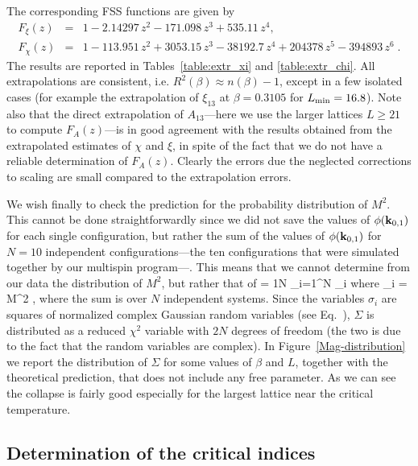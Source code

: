 \documentclass[12pt]{article}
\newcommand{\text}{\rm}
\begin{document}
The corresponding FSS functions are given by
\begin{eqnarray}
F_\xi(z) &=& 
1 - 2.14297\,z^2 - 171.098\,z^3 + 535.11\,z^4,  \\
F_\chi(z) &=& 
1 - 113.951\,z^2 + 3053.15\,z^3 - 38192.7\,z^4 + 204378\,z^5 -
394893\,z^6\; .
\end{eqnarray}
The results are reported in 
Tables~\ref{table:extr_xi} and \ref{table:extr_chi}.
All extrapolations are consistent, i.e. 
$R^2(\beta) \approx n(\beta) - 1$,  except in a few
isolated cases (for example the extrapolation of $\xi_{13}$ 
at $\beta=0.3105$ for $L_{\text{min}}=16.8$). Note also that
the direct extrapolation 
of $A_{13}$---here we use the larger lattices $L\ge 21$ to compute 
$F_A(z)$---is in good agreement with the results obtained from the 
extrapolated estimates of $\chi$ and $\xi$, in spite of the fact 
that we do not have a reliable determination of $F_A(z)$. 
Clearly the errors due the neglected corrections to scaling
are small compared to the extrapolation errors.

We wish finally to check the prediction 
 for the probability distribution of 
$M^2$. This cannot be done straightforwardly since we did not 
save the values of $\phi({\bf k}_{0,1})$ for each 
single configuration, but rather the sum of the values of 
$\phi({\bf k}_{0,1})$ for $N=10$ independent configurations---the 
ten configurations that were simulated together by our 
multispin program---. This means that we cannot determine from our
data the distribution of $M^2$, but rather that of 
\be 
       \Sigma = {1\over N} \sum_{i=1}^N \sigma_i
\ee
where 
\be
\sigma_i = {M^2  \over \chi},
\ee
where the sum is over $N$ independent systems. Since the variables 
$\sigma_i$ are squares of normalized
complex Gaussian random variables (see Eq.~), 
$\Sigma$ is distributed as a
reduced $\chi^2$ variable with $2 N$ degrees of freedom (the two is due to the 
fact that the random variables  are complex).
In Figure~\ref{Mag-distribution} we report the distribution of
$\Sigma$ for some values of $\beta$ and $L$, together with the 
theoretical prediction, that does not include any free parameter.
As we can see the collapse is fairly good 
especially for the largest lattice near the critical temperature.

\subsection{Determination of the critical indices} \label{sec.5-3}
\end{document}
